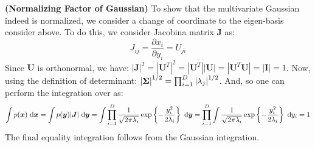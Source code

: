 \begin{remark}{\textbf{(Normalizing Factor of Gaussian)}}
    To show that the multivariate Gaussian indeed is normalized, we consider a change of coordinate to the eigen-basis consider above. To do this, we consider Jacobina matrix $\boldsymbol J$ as:
    \begin{equation*}
        J_{ij} = \frac{\partial x_i}{\partial y_i} = U_{ji}
    \end{equation*}
    Since $\boldsymbol U$ is orthonormal, we have: $|\boldsymbol J|^2 = |\boldsymbol U^T|^2 = |\boldsymbol U^T||\boldsymbol U| = |\boldsymbol U^T\boldsymbol U| = |\boldsymbol I| = 1$. Now, using the definition of determinant: $\left| \boldsymbol \Sigma \right|^{1/2} = \prod^D_{i=1}\left| \lambda_j \right|^{1/2}$. And, so one can perform the integration over as:
    \begin{equation*}
        \int p(\boldsymbol x)\ \mathrm{d}\boldsymbol x = \int p(\boldsymbol y)|\boldsymbol J| \ \mathrm{d} \boldsymbol y = \int \prod^D_{i=1} \frac{1}{\sqrt{2\pi\lambda_i}}\exp\left\{ -\frac{y_i^2}{2\lambda_i} \right\}\ \mathrm{d} \boldsymbol y = \prod^D_{i=1} \int \frac{1}{\sqrt{2\pi\lambda_i}}\exp\left\{ -\frac{y_i^2}{2\lambda_i} \right\}\ \mathrm{d} y_i = 1
    \end{equation*}
    The final equality integration follows from the Gaussian integration.
\end{remark}

